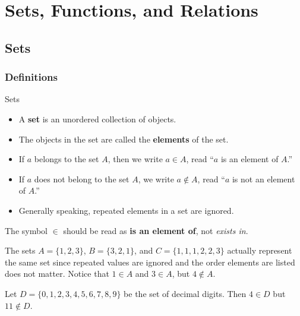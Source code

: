 \chapter{Sets, Functions, and Relations}\label{chapter:sets}

\section{Sets}\label{section:sets}

\subsection{Definitions}\label{section:setDefs}


\begin{df}
Sets

\begin{itemize}
\item
A {\bf set} is an unordered collection of
objects. 
\item The objects in the set are called the {\bf elements} of the set.
\item
 If $a$ belongs to the set $A$, then we write $a\in
A$, read ``$a$ is an element of $A$.''
\item
If $a$ does not belong to the set $A$, we write $a\not\in A$, read ``$a$ is  
not an element of $A$.'' 
\item
Generally speaking, repeated elements in a set are ignored.
\end{itemize}
\end{df}

\begin{rem}
The symbol $\in$ should be read as {\bf is an element of}, not {\em exists in}.
\end{rem}

\begin{exa}\label{setsexa1}
The sets $A=\{1, 2, 3\}$, $B=\{3, 2, 1\}$,  and $C=\{1, 1, 1, 2, 2, 3\}$ actually represent the same set
since repeated values are ignored and the order elements are listed
does not matter.  Notice that $1\in A$ and $3\in A$, but $4\not\in A$.

Let $D=\{0,1,2,3,4,5,6,7,8,9\}$ be the set of decimal
digits. Then $4\in D$ but $11\nin D$.  

\end{exa}

